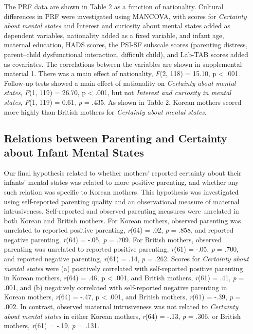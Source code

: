\documentclass[
]{article}
\begin{document}
The PRF data are shown in Table 2 as a function of nationality. Cultural differences in PRF were investigated using MANCOVA, with scores for \emph{Certainty about mental states} and Interest and curiosity about mental states added as dependent variables, nationality added as a fixed variable, and infant age, maternal education, HADS scores, the PSI-SF subscale scores (parenting distress, parent--child dysfunctional interaction, difficult child), and Lab-TAB scores added as covariates. The correlations between the variables are shown in supplemental material 1. There was a main effect of nationality, \emph{F}(2, 118) = 15.10, p \textless{} .001. Follow-up tests showed a main effect of nationality on \emph{Certainty about mental states}, \emph{F}(1, 119) = 26.70, p \textless{} .001, but not \emph{Interest and curiosity in mental states}, \emph{F}(1, 119) = 0.61, \emph{p} = .435. As shown in Table 2, Korean mothers scored more highly than British mothers for \emph{Certainty about mental states}.

\hypertarget{relations-between-parenting-and-certainty-about-infant-mental-states}{%
\subsection*{Relations between Parenting and Certainty about Infant Mental States}\label{relations-between-parenting-and-certainty-about-infant-mental-states}}

Our final hypothesis related to whether mothers' reported certainty about their infants' mental states was related to more positive parenting, and whether any such relation was specific to Korean mothers. This hypothesis was investigated using self-reported parenting quality and an observational measure of maternal intrusiveness. Self-reported and observed parenting measures were unrelated in both Korean and British mothers. For Korean mothers, observed parenting was unrelated to reported positive parenting, \emph{r}(64) = .02, \emph{p} = .858, and reported negative parenting, \emph{r}(64) = -.05, \emph{p} = .709. For British mothers, observed parenting was unrelated to reported positive parenting, \emph{r}(61) = -.05, \emph{p} = .700, and reported negative parenting, \emph{r}(61) = .14, \emph{p} = .262. Scores for \emph{Certainty about mental states} were (a) positively correlated with self-reported positive parenting in Korean mothers, \emph{r}(64) = .46, p \textless{} .001, and British mothers, \emph{r}(61) = .41, \emph{p} = .001, and (b) negatively correlated with self-reported negative parenting in Korean mothers, \emph{r}(64) = -.47, p \textless{} .001, and British mothers, \emph{r}(61) = -.39, \emph{p} = .002. In contrast, observed maternal intrusiveness was not related to \emph{Certainty about mental states} in either Korean mothers, \emph{r}(64) = -.13, \emph{p} = .306, or British mothers, \emph{r}(61) = -.19, \emph{p} = .131.
\end{document}
